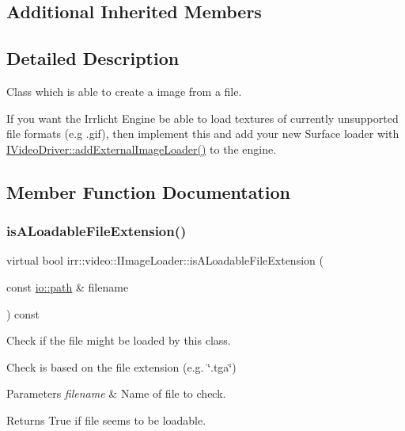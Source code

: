 \subsection*{Additional Inherited Members}


\subsection{Detailed Description}
Class which is able to create a image from a file. 

If you want the Irrlicht Engine be able to load textures of currently unsupported file formats (e.\+g .gif), then implement this and add your new Surface loader with \hyperlink{classirr_1_1video_1_1IVideoDriver_a9479ae15f0e26eaaf15c9420ff289b6d}{I\+Video\+Driver\+::add\+External\+Image\+Loader()} to the engine. 

\subsection{Member Function Documentation}
\mbox{\label{classirr_1_1video_1_1IImageLoader_a74f191446424017b8a71fea274bd0f0a}} 
\subsubsection{\texorpdfstring{is\+A\+Loadable\+File\+Extension()}{isALoadableFileExtension()}}
{\footnotesize\ttfamily virtual bool irr\+::video\+::\+I\+Image\+Loader\+::is\+A\+Loadable\+File\+Extension (\begin{DoxyParamCaption}\item[{const \hyperlink{namespaceirr_1_1io_ab1bdc45edb3f94d8319c02bc0f840ee1}{io\+::path} \&}]{filename }\end{DoxyParamCaption}) const\hspace{0.3cm}{\ttfamily [pure virtual]}}



Check if the file might be loaded by this class. 

Check is based on the file extension (e.\+g. \char`\"{}.\+tga\char`\"{}) 
\begin{DoxyParams}{Parameters}
{\em filename} & Name of file to check. \\
\hline
\end{DoxyParams}
\begin{DoxyReturn}{Returns}
True if file seems to be loadable. 
\end{DoxyReturn}
\mbox{\label{classirr_1_1video_1_1IImageLoader_aeb87ae825dfdb747e826b1e001a5f5cc}} 

